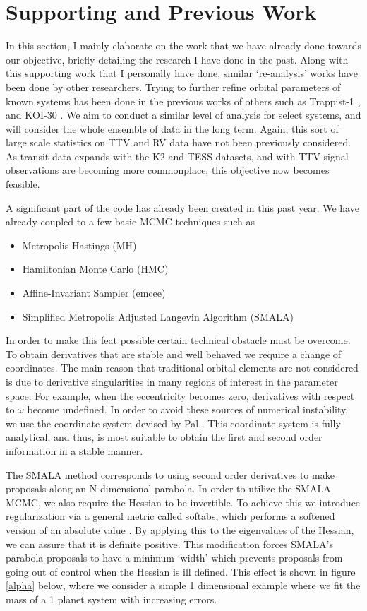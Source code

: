 \section{Supporting and Previous Work}
In this section, I mainly elaborate on the work that we have already done towards our objective, briefly detailing the research I have done in the past.
Along with this supporting work that I personally have done, similar `re-analysis' works have been done by other researchers.
Trying to further refine orbital parameters of known systems has been done in the previous works of others such as Trappist-1 \cite{1704.04290}, and KOI-30 \cite{1707.04962} .
We aim to conduct a similar level of analysis for select systems, and will consider the whole ensemble of data in the long term.
Again, this sort of large scale statistics on TTV and RV data have not been previously considered.
As transit data expands with the K2 and TESS datasets, and with TTV signal observations are becoming more commonplace, this objective now becomes feasible.


A significant part of the code has already been created in this past year.
We have already coupled \reb to a few basic MCMC techniques such as 
\begin{itemize}
	\item Metropolis-Hastings (MH)
	\item Hamiltonian Monte Carlo (HMC)
	\item Affine-Invariant Sampler (emcee)
	\item Simplified Metropolis Adjusted Langevin Algorithm (SMALA)
\end{itemize}
In order to make this feat possible certain technical obstacle must be overcome.
To obtain derivatives that are stable and well behaved we require a change of coordinates.
The main reason that traditional orbital elements are not considered is due to derivative singularities in many regions of interest in the parameter space.
For example, when the eccentricity becomes zero, derivatives with respect to $\omega$ become undefined.
In order to avoid these sources of numerical instability, we use the coordinate system devised by Pal \cite{pal2009analytical}.
This coordinate system is fully analytical, and thus, is most suitable to obtain the first and second order information in a stable manner.


The SMALA method corresponds to using second order derivatives to make proposals along an N-dimensional parabola.
In order to utilize the SMALA MCMC, we also require the Hessian to be invertible.
To achieve this we introduce regularization via a general metric called softabs, which performs a softened version of an absolute value \cite{softabs}.
By applying this to the eigenvalues of the Hessian, we can assure that it is definite positive.
This modification forces SMALA's parabola proposals to have a minimum `width' which prevents proposals from going out of control when the Hessian is ill defined.
This effect is shown in figure \ref{alpha} below, where we consider a simple 1 dimensional example where we fit the mass of a 1 planet system with increasing errors.

